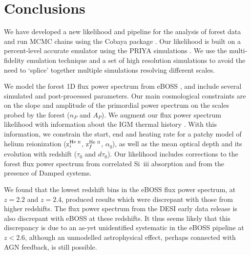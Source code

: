 \section{Conclusions}\label{sec:conclusions}

We have developed a new likelihood and pipeline for the analysis of \Lya forest data and run MCMC chains using the Cobaya package \cite{2021JCAP...05..057T, 2019ascl.soft10019T}. Our likelihood is built on a percent-level accurate emulator using the PRIYA simulations \cite{2023simsuite}. We use the multi-fidelity emulation technique \cite{2022MNRAS.517.3200F} and a set of high resolution simulations to avoid the need to `splice' together multiple simulations resolving different scales.

We model the \Lya forest 1D flux power spectrum from eBOSS \cite{2019JCAP...07..017C}, and include several simulated and post-processed parameters. Our main cosmological constraints are on the slope and amplitude of the primordial power spectrum on the scales probed by the \Lya forest ($n_P$ and $A_P$). 
We augment our \Lya flux power spectrum likelihood with information about the IGM thermal history \cite{2021MNRAS.506.4389G}.
With this information, we constrain the start, end and heating rate for a patchy model of helium reionization (z$^{\text{He~{\sc ii}}}_i$, z$^{\text{He~{\sc ii}}}_f$, $\alpha_q$), as well as the mean optical depth and its evolution with redshift ($\tau_0$ and $d\tau_0$).
Our likelihood includes corrections to the \lya forest flux power spectrum from correlated Si~{\sc iii} absorption and from the presence of Damped \lya systems.

We found that the lowest redshift bins in the eBOSS flux power spectrum, at $z=2.2$ and $z=2.4$, produced results which were discrepant with those from higher redshifts. The flux power spectrum from the DESI early data release is also discrepant with eBOSS at these redshifts. It thus seems likely that this discrepancy is due to an as-yet unidentified systematic in the eBOSS pipeline at $z < 2.6$, although an unmodelled astrophysical effect, perhaps connected with AGN feedback, is still possible.  

